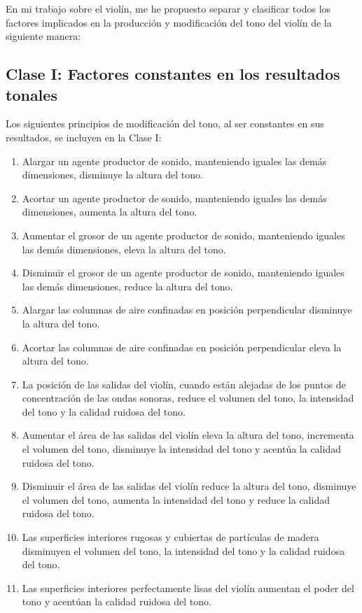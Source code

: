 \documentclass[12pt]{book}
\begin{document}
En mi trabajo sobre el violín, me he propuesto separar y clasificar todos los factores implicados en la producción y modificación del tono del violín de la siguiente manera:

\subsection*{Clase I: Factores constantes en los resultados tonales}

Los siguientes principios de modificación del tono, al ser constantes en sus resultados, se incluyen en la Clase I:

\begin{enumerate}
    \item Alargar un agente productor de sonido, manteniendo iguales las demás dimensiones, disminuye la altura del tono.
    \item Acortar un agente productor de sonido, manteniendo iguales las demás dimensiones, aumenta la altura del tono.
    \item Aumentar el grosor de un agente productor de sonido, manteniendo iguales las demás dimensiones, eleva la altura del tono.
    \item Disminuir el grosor de un agente productor de sonido, manteniendo iguales las demás dimensiones, reduce la altura del tono.
    \item Alargar las columnas de aire confinadas en posición perpendicular disminuye la altura del tono.
    \item Acortar las columnas de aire confinadas en posición perpendicular eleva la altura del tono.
    \item La posición de las salidas del violín, cuando están alejadas de los puntos de concentración de las ondas sonoras, reduce el volumen del tono, la intensidad del tono y la calidad ruidosa del tono.
    \item Aumentar el área de las salidas del violín eleva la altura del tono, incrementa el volumen del tono, disminuye la intensidad del tono y acentúa la calidad ruidosa del tono.
    \item Disminuir el área de las salidas del violín reduce la altura del tono, disminuye el volumen del tono, aumenta la intensidad del tono y reduce la calidad ruidosa del tono.
    \item Las superficies interiores rugosas y cubiertas de partículas de madera disminuyen el volumen del tono, la intensidad del tono y la calidad ruidosa del tono.
    \item Las superficies interiores perfectamente lisas del violín aumentan el poder del tono y acentúan la calidad ruidosa del tono.
\end{enumerate}
\end{document}
